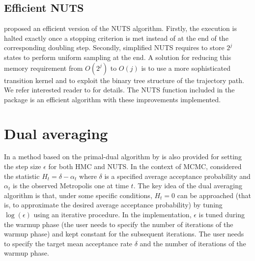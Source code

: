 \documentclass{article}
\begin{document}
\subsection{Efficient NUTS}
\par \citet{hoffman2014nuts} proposed an efficient version of the NUTS algorithm. Firstly, the execution is halted exactly once a stopping criterion is met instead of at the end of the corresponding doubling step. Secondly, simplified NUTS requires to store $2^j$ states to perform uniform sampling at the end. A solution for reducing this memory requirement from $O(2^j)$ to $O(j)$ is to use a more sophisticated transition kernel and to exploit the binary tree structure of the trajectory path. We refer interested reader to \citet{hoffman2014nuts} for details. The NUTS function included in the package is an efficient algorithm with these improvements implemented.


\section{Dual averaging}

In \citet{hoffman2014nuts} a method based on the primal-dual algorithm by \citet{nesterov2009dual} is also provided for setting the step size $\epsilon$ for both HMC and NUTS.
In the context of MCMC, considered the statistic $H_t=\delta-\alpha_t$ where $\delta$ is a specified average acceptance probability and $\alpha_t$ is the observed Metropolis one at time $t$. %
The key idea of the dual averaging algorithm is that, under some specific conditions, $H_t=0$ can be approached (that is, to approximate the desired average acceptance probability) by tuning $\log(\epsilon)$ using an iterative procedure. In the implementation, $\epsilon$ is tuned during the warmup phase (the user needs to specify the number of iterations of the warmup phase) and kept constant for the subsequent iterations. The user needs to specify the target mean acceptance rate $\delta$ and the number of iterations of the warmup phase.
\end{document}
